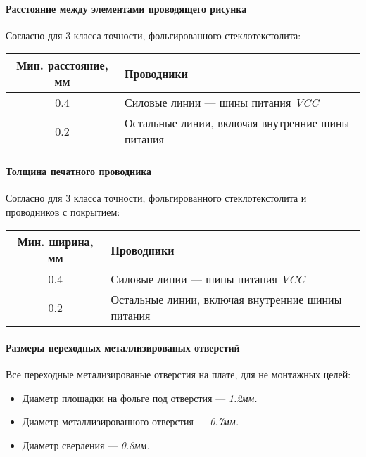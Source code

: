 \paragraph{Расстояние между элементами проводящего рисунка}
Согласно \cite[Табл. 7]{GOST_23751_86} для 3 класса точности,
фольгированного стеклотекстолита:

\begin{tabular}{|c|l|}
    \hline
    Мин. расстояние, мм & Проводники \\
    \hline
    0.4 & Силовые линии --- шины питания \textit{VCC} \\
    \hline
    0.2 & Остальные линии, включая внутренние шины питания \\
    \hline
\end{tabular}

\paragraph{Толщина печатного проводника}
Согласно \cite[Табл. 9]{GOST_23751_86} для 3 класса точности,
фольгированного стеклотекстолита и проводников с покрытием:

\begin{tabular}{|c|l|}
    \hline
    Мин. ширина, мм & Проводники \\
    \hline
    0.4 & Силовые линии --- шины питания \textit{VCC} \\
    \hline
    0.2 & Остальные линии, включая внутренние шиниы питания \\
    \hline
\end{tabular}

\paragraph{Размеры переходных металлизированых отверстий}
Все переходные метализированые отверстия на плате, для не монтажных целей:

\begin{itemize}
    \item Диаметр площадки на фольге под отверстия --- \textit{1.2мм.}
    \item Диаметр металлизированного отверстия --- \textit{0.7мм.}
    \item Диаметр сверления --- \textit{0.8мм.}
\end{itemize}
